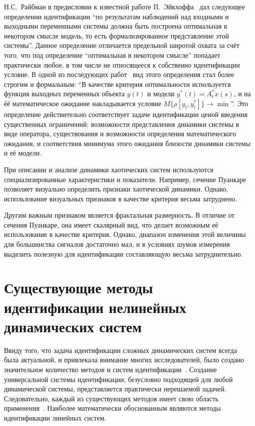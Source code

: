 Н.С.~Райбман в предисловии к известной работе П.~Эйкхоффа~\cite{eykhoff_id_base}
дал следующее определении идентификации
``по результатам наблюдений над входными и выходными переменными системы должна быть
построена оптимальная в некотором смысле модель, то есть формализированное представление этой системы''.
Данное определение отличается предельной широтой охвата за счёт того,
что под определение ``оптимальная в некотором смысле'' попадает
практически любое, в том числе не относящееся к собственно идентификации условие.
В одной из последующих работ~\cite{raibman_id_obj_ctl}
вид этого определения стал более строгим и формальным:
``В качестве критерия оптимальности используется функция выходных переменных объекта $y(t)$ и модели
$y^{*}(t) = A_t^{*} x(s) $, и на ёё математическое ожидание накладывается условие
$M \{\rho [ y_t, y_t^{*} ] \} \to {\min}$''.
Это определение действительно соответствует задаче идентификации ценой
введения существенных ограничений: возможности представления динамики системы в виде оператора,
существования и возможности определения математического ожидания,
и соответствия минимума этого ожидания близости динамики системы и её модели.







При описании и анализе динамики хаотических
систем используются специализированные характеристики и показатели.
Например, сечение Пуанкаре~\cite{moon_chaotic_vibr,anisch_complex_vibrations_in_simple_systems,atu_st105}
позволяет визуально определить признаки хаотической динамики.
Однако, использование визуальных признаков в качестве критерия
весьма затруднено.

Другим важным признаком является фрактальная размерность. %
В отличие от сечения Пуанкаре, она имеет скалярный вид,
что делает возможным её использование в качестве критерия.
Однако, диапазон изменения этой величины для большинства сигналов достаточно мал,
и в условиях шумов измерения выделить полезную
для идентификации составляющую весьма затруднительно.


\section{Существующие методы идентификации нелинейных динамических систем}  %

Ввиду того, что задача идентификации сложных динамических систем всегда была актуальной,
и привлекала внимание многих исследователей, было создано
значительное количество методов и систем идентификации~\cite{eykhoff_id_base,leondes_modern_tu,nelles_nlsys_id}.
Создание универсальной системы идентификации, безусловно подходящей для
любой динамической системы, представляется практически нерешаемой задачей.
Следовательно, каждый из существующих методов имеет свою область применения~\cite{rastr_intro}.
Наиболее математически обоснованным являются методы идентификации
линейных систем.

